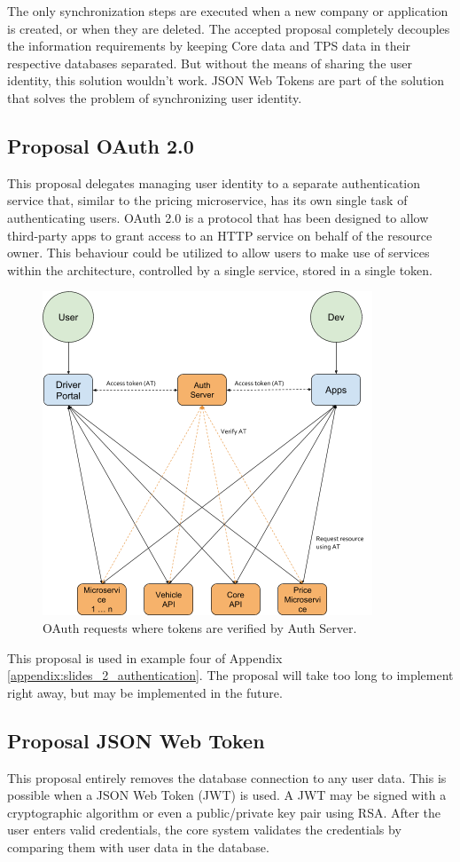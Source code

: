The only synchronization steps are executed when a new company or application is created, or when they are deleted. The accepted proposal completely decouples the information requirements by keeping Core data and TPS data in their respective databases separated. But without the means of sharing the user identity, this solution wouldn't work. JSON Web Tokens are part of the solution that solves the problem of synchronizing user identity.

\subsection{Proposal OAuth 2.0}
This proposal delegates managing user identity to a separate authentication service that, similar to the pricing microservice, has its own single task of authenticating users. OAuth 2.0 is a protocol that has been designed to allow third-party apps to grant access to an HTTP service on behalf of the resource owner. This behaviour could be utilized to allow users to make use of services within the architecture, controlled by a single service, stored in a single token.

\begin{figure}[H]
	\centering
	\includegraphics[width=.7\textwidth]{Auth1}
	\caption[OAuth 2.0]{OAuth requests where tokens are verified by Auth Server.}
	\label{fig:Auth1}
\end{figure}

This proposal is used in example four of Appendix \ref{appendix:slides_2_authentication}. The proposal will take too long to implement right away, but may be implemented in the future.

\subsection{Proposal JSON Web Token}
This proposal entirely removes the database connection to any user data. This is possible when a JSON Web Token (JWT) is used. A JWT may be signed with a cryptographic algorithm or even a public/private key pair using RSA. After the user enters valid credentials, the core system validates the credentials by comparing them with user data in the database.

